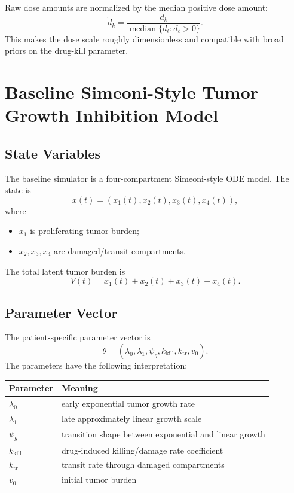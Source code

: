 \documentclass[11pt,a4paper]{article}
\begin{document}
Raw dose amounts are normalized by the median positive dose amount:
\[
    \tilde{d}_k
    = \frac{d_k}{\operatorname{median}\{d_\ell: d_\ell > 0\}}.
\]
This makes the dose scale roughly dimensionless and compatible with broad priors on the drug-kill parameter.

\section{Baseline Simeoni-Style Tumor Growth Inhibition Model}

\subsection{State Variables}

The baseline simulator is a four-compartment Simeoni-style ODE model. The state is
\[
    x(t) = (x_1(t), x_2(t), x_3(t), x_4(t)),
\]
where
\begin{itemize}[leftmargin=2em]
    \item $x_1$ is proliferating tumor burden;
    \item $x_2,x_3,x_4$ are damaged/transit compartments.
\end{itemize}
The total latent tumor burden is
\[
    V(t) = x_1(t)+x_2(t)+x_3(t)+x_4(t).
\]

\subsection{Parameter Vector}

The patient-specific parameter vector is
\[
    \theta
    = (\lambda_0, \lambda_1, \psi_g, k_{\mathrm{kill}}, k_{\mathrm{tr}}, v_0).
\]
The parameters have the following interpretation:
\begin{center}
\begin{tabular}{ll}
\toprule
Parameter & Meaning \\
\midrule
$\lambda_0$ & early exponential tumor growth rate \\
$\lambda_1$ & late approximately linear growth scale \\
$\psi_g$ & transition shape between exponential and linear growth \\
$k_{\mathrm{kill}}$ & drug-induced killing/damage rate coefficient \\
$k_{\mathrm{tr}}$ & transit rate through damaged compartments \\
$v_0$ & initial tumor burden \\
\bottomrule
\end{tabular}
\end{center}
\end{document}
